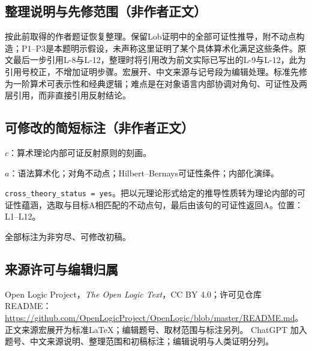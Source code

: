 \documentclass[UTF8,11pt]{ctexart}
\theoremstyle{definition}
\begin{document}
\subsection*{整理说明与先修范围（非作者正文）}
按此前取得的作者题证恢复整理。保留Lob证明中的全部可证性推导，附不动点构造；P1--P3是本题明示假设，未声称这里证明了某个具体算术化满足这些条件。原文最后一步引用L-8与L-12，整理时将引用改为前文实际已写出的L-9与L-12，此为引用号校正，不增加证明步骤。宏展开、中文来源与记号段为编辑处理。标准先修为一阶算术可表示性和经典逻辑；难点是在对象语言内部协调对角句、可证性及两层引用，而非直接引用反射结论。
\subsection*{可修改的简短标注（非作者正文）}
$c$：算术理论内部可证反射原则的刻画。

$a$：语法算术化；对角不动点；Hilbert--Bernays可证性条件；内部化演绎。

\texttt{cross\_theory\_status = yes}。把以元理论形式给定的推导性质转为理论内部的可证性蕴涵，选取与目标A相匹配的不动点句，最后由该句的可证性返回A。位置：L1--L12。

全部标注为非穷尽、可修改初稿。
\subsection*{来源许可与编辑归属}
Open Logic Project，\emph{The Open Logic Text}，CC BY 4.0；许可见仓库README：\url{https://github.com/OpenLogicProject/OpenLogic/blob/master/README.md}。正文来源宏展开为标准LaTeX；编辑题号、取材范围与标注另列。
ChatGPT 加入题号、中文来源说明、整理范围和初稿标注；编辑说明与人类证明分列。
\end{document}
